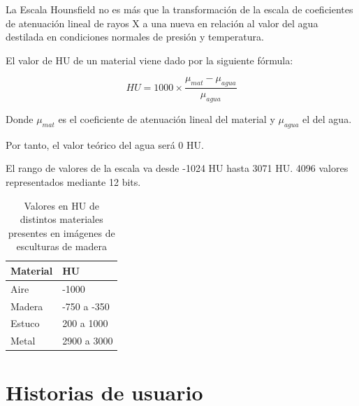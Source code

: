 La Escala Hounsfield no es más que la transformación de la escala de coeficientes de atenuación lineal de rayos X a una nueva en relación al valor del agua destilada en condiciones normales de presión y temperatura.

El valor de HU de un material viene dado por la siguiente fórmula:

\[ HU = 1000 \times \frac{\mu_{mat}-\mu_{agua}}{\mu_{agua}} \]

Donde $ \mu_{mat} $ es el coeficiente de atenuación lineal del material y $ \mu_{agua} $ el del agua.

Por tanto, el valor teórico del agua será 0 HU.

El rango de valores de la escala va desde -1024 HU hasta 3071 HU. 4096 valores representados mediante 12 bits.

\begin{table}[H]
	\begin{center}
		\begin{tabular} {|l|l|}
			\hline
			Material & HU \\ \hline
			\hline
			Aire & -1000 \\ \hline
			Madera & -750 a -350 \\ \hline
			Estuco & 200 a 1000 \\ \hline
			Metal & 2900 a 3000 \\ \hline
		\end{tabular}
		\caption{Valores en HU de distintos materiales presentes en imágenes de esculturas de madera}
		\label{tab:materials_hu}
	\end{center}
\end{table}

\section{Historias de usuario}

